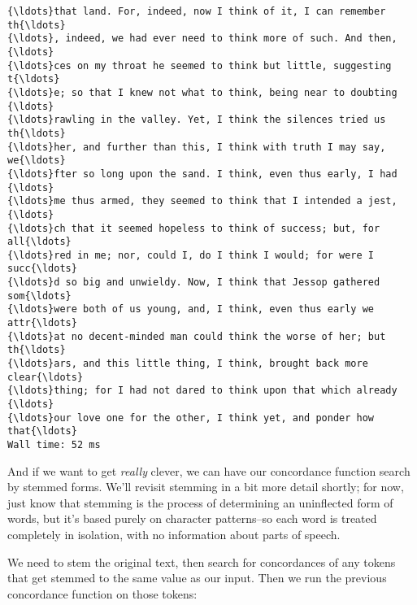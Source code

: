 \documentclass[11pt]{article}
\begin{document}
    \begin{Verbatim}[commandchars=\\\{\}]
{\ldots}that land. For, indeed, now I think of it, I can remember th{\ldots}
{\ldots}, indeed, we had ever need to think more of such. And then, {\ldots}
{\ldots}ces on my throat he seemed to think but little, suggesting t{\ldots}
{\ldots}e; so that I knew not what to think, being near to doubting {\ldots}
{\ldots}rawling in the valley. Yet, I think the silences tried us th{\ldots}
{\ldots}her, and further than this, I think with truth I may say, we{\ldots}
{\ldots}fter so long upon the sand. I think, even thus early, I had {\ldots}
{\ldots}me thus armed, they seemed to think that I intended a jest, {\ldots}
{\ldots}ch that it seemed hopeless to think of success; but, for all{\ldots}
{\ldots}red in me; nor, could I, do I think I would; for were I succ{\ldots}
{\ldots}d so big and unwieldy. Now, I think that Jessop gathered som{\ldots}
{\ldots}were both of us young, and, I think, even thus early we attr{\ldots}
{\ldots}at no decent-minded man could think the worse of her; but th{\ldots}
{\ldots}ars, and this little thing, I think, brought back more clear{\ldots}
{\ldots}thing; for I had not dared to think upon that which already {\ldots}
{\ldots}our love one for the other, I think yet, and ponder how that{\ldots}
Wall time: 52 ms

    \end{Verbatim}

    And if we want to get \emph{really} clever, we can have our concordance
function search by stemmed forms. We'll revisit stemming in a bit more
detail shortly; for now, just know that stemming is the process of
determining an uninflected form of words, but it's based purely on
character patterns--so each word is treated completely in isolation,
with no information about parts of speech.

We need to stem the original text, then search for concordances of any
tokens that get stemmed to the same value as our input. Then we run the
previous concordance function on those tokens:
\end{document}
